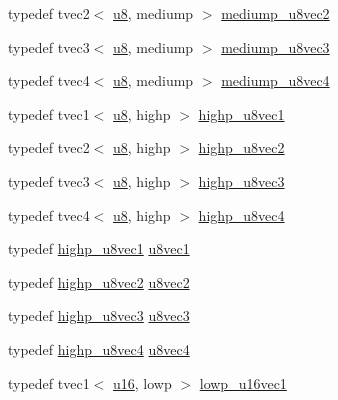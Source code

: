 \begin{DoxyCompactItemize}
\item 
typedef tvec2$<$ \hyperlink{group__gtc__type__precision_ga5e3dc67373d5068997d2d9f41c9024d2}{u8}, mediump $>$ \hyperlink{namespaceglm_a57c53a29ee903a4f472596d44b5b2329}{mediump\+\_\+u8vec2}
\item 
typedef tvec3$<$ \hyperlink{group__gtc__type__precision_ga5e3dc67373d5068997d2d9f41c9024d2}{u8}, mediump $>$ \hyperlink{namespaceglm_a10e59f2fda069e95dae490e1a08879f8}{mediump\+\_\+u8vec3}
\item 
typedef tvec4$<$ \hyperlink{group__gtc__type__precision_ga5e3dc67373d5068997d2d9f41c9024d2}{u8}, mediump $>$ \hyperlink{namespaceglm_a7f5ea1d9cc541f389e1dc8e322a7c2e6}{mediump\+\_\+u8vec4}
\item 
typedef tvec1$<$ \hyperlink{group__gtc__type__precision_ga5e3dc67373d5068997d2d9f41c9024d2}{u8}, highp $>$ \hyperlink{namespaceglm_aec8648cdcf1bacd47205d172240be623}{highp\+\_\+u8vec1}
\item 
typedef tvec2$<$ \hyperlink{group__gtc__type__precision_ga5e3dc67373d5068997d2d9f41c9024d2}{u8}, highp $>$ \hyperlink{namespaceglm_a38a7141fa9ddd5fb59abd032d870525a}{highp\+\_\+u8vec2}
\item 
typedef tvec3$<$ \hyperlink{group__gtc__type__precision_ga5e3dc67373d5068997d2d9f41c9024d2}{u8}, highp $>$ \hyperlink{namespaceglm_a08514b578ab54cef81fac88773e27e17}{highp\+\_\+u8vec3}
\item 
typedef tvec4$<$ \hyperlink{group__gtc__type__precision_ga5e3dc67373d5068997d2d9f41c9024d2}{u8}, highp $>$ \hyperlink{namespaceglm_adfad96397d5689c0c925dacf0f302da0}{highp\+\_\+u8vec4}
\item 
typedef \hyperlink{namespaceglm_aec8648cdcf1bacd47205d172240be623}{highp\+\_\+u8vec1} \hyperlink{group__gtc__type__precision_ga024be724ff45865952190522b03fc0d5}{u8vec1}
\item 
typedef \hyperlink{namespaceglm_a38a7141fa9ddd5fb59abd032d870525a}{highp\+\_\+u8vec2} \hyperlink{group__gtc__type__precision_ga1c259b876f8757eb197b83a5fab476f0}{u8vec2}
\item 
typedef \hyperlink{namespaceglm_a08514b578ab54cef81fac88773e27e17}{highp\+\_\+u8vec3} \hyperlink{group__gtc__type__precision_ga8262aeb120701de1b57773eb10be0f35}{u8vec3}
\item 
typedef \hyperlink{namespaceglm_adfad96397d5689c0c925dacf0f302da0}{highp\+\_\+u8vec4} \hyperlink{group__gtc__type__precision_gaf3c840b8a90a194559121504ba599197}{u8vec4}
\item 
typedef tvec1$<$ \hyperlink{group__gtc__type__precision_gae7a1571503f83d2264ddfa705a6b082a}{u16}, lowp $>$ \hyperlink{namespaceglm_aa045c5f3ae5b7560ab32428243eb2ba0}{lowp\+\_\+u16vec1}

\end{DoxyCompactItemize}
